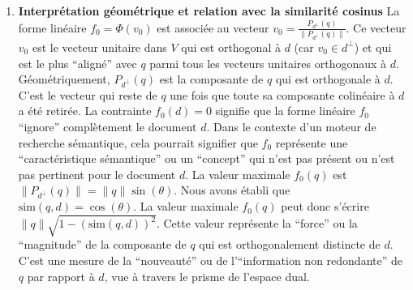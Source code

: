 \documentclass[11pt,a4paper]{report}
\begin{document}
\begin{enumerate}
\begin{enumerate}
    Substituons cette expression :
    \[ \|P_{d^\perp}(q)\|^2 = \|q\|^2 - \frac{(\|q\| \|d\| \text{sim}(q,d))^2}{\|d\|^2} \]
    \[ = \|q\|^2 - \frac{\|q\|^2 \|d\|^2 (\text{sim}(q,d))^2}{\|d\|^2} \]
    \[ = \|q\|^2 - \|q\|^2 (\text{sim}(q,d))^2 \]
    \[ = \|q\|^2 (1 - (\text{sim}(q,d))^2) \] Soit \(\theta\) l'angle
    entre \(q\) et \(d\). Alors \(\text{sim}(q,d) = \cos(\theta)\).
    \[ \|P_{d^\perp}(q)\|^2 = \|q\|^2 (1 - \cos^2(\theta)) = \|q\|^2 \sin^2(\theta) \]
    Puisque \(q\) et \(d\) sont linéairement indépendants,
    \(\theta \neq 0\) et \(\theta \neq \pi\). Par conséquent,
    \(\sin(\theta) \neq 0\). De plus, pour \(\theta \in [0, \pi]\),
    \(\sin(\theta) \ge 0\). Donc,
    \(\|P_{d^\perp}(q)\| = \sqrt{\|q\|^2 \sin^2(\theta)} = \|q\| \sin(\theta)\).

    La valeur maximale \(f_0(q)\) est donc \(\|q\| \sin(\theta)\), où
    \(\theta\) est l'angle entre \(q\) et \(d\).
  \item
    \textbf{Interprétation géométrique et relation avec la similarité
    cosinus} La forme linéaire \(f_0 = \Phi(v_0)\) est associée au
    vecteur \(v_0 = \frac{P_{d^\perp}(q)}{\|P_{d^\perp}(q)\|}\). Ce
    vecteur \(v_0\) est le vecteur unitaire dans \(V\) qui est
    orthogonal à \(d\) (car \(v_0 \in d^\perp\)) et qui est le plus
    ``aligné'' avec \(q\) parmi tous les vecteurs unitaires orthogonaux
    à \(d\). Géométriquement, \(P_{d^\perp}(q)\) est la composante de
    \(q\) qui est orthogonale à \(d\). C'est le vecteur qui reste de
    \(q\) une fois que toute sa composante colinéaire à \(d\) a été
    retirée. La contrainte \(f_0(d) = 0\) signifie que la forme linéaire
    \(f_0\) ``ignore'' complètement le document \(d\). Dans le contexte
    d'un moteur de recherche sémantique, cela pourrait signifier que
    \(f_0\) représente une ``caractéristique sémantique'' ou un
    ``concept'' qui n'est pas présent ou n'est pas pertinent pour le
    document \(d\). La valeur maximale \(f_0(q)\) est
    \(\|P_{d^\perp}(q)\| = \|q\| \sin(\theta)\). Nous avons établi que
    \(\text{sim}(q,d) = \cos(\theta)\). La valeur maximale \(f_0(q)\)
    peut donc s'écrire \(\|q\| \sqrt{1 - (\text{sim}(q,d))^2}\). Cette
    valeur représente la ``force'' ou la ``magnitude'' de la composante
    de \(q\) qui est orthogonalement distincte de \(d\). C'est une
    mesure de la ``nouveauté'' ou de l'``information non redondante'' de
    \(q\) par rapport à \(d\), vue à travers le prisme de l'espace dual.

    \begin{itemize}


\end{itemize}
\end{enumerate}
\end{enumerate}
\end{document}
